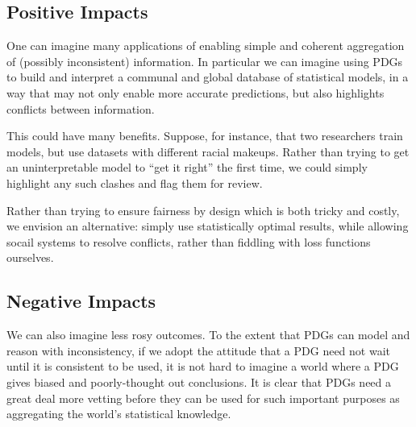 \documentclass[letterpaper]{article} %
\theoremstyle{plain}
\theoremstyle{definition}
\theoremstyle{remark}
\begin{document}
\subsection{Positive Impacts}
One can imagine many applications of enabling simple and coherent
aggregation of (possibly inconsistent) information. In particular we
can imagine using PDGs to build and interpret a communal and global
database of statistical models, in a way that may not only enable more
accurate predictions, but also highlights conflicts between
information.

This could have many benefits.
Suppose, for instance, that two researchers train models, but use
datasets with
different racial makeups. Rather than trying to get an uninterpretable
model to ``get it right'' the first time, we could simply highlight any
such clashes and flag them for review.

Rather than trying to
ensure fairness by design which is both tricky and costly,
we envision an alternative: simply use
statistically optimal results, while allowing socail systems to resolve conflicts,
rather than fiddling with loss functions ourselves.

\subsection{Negative Impacts}

We can also imagine less rosy outcomes. To the extent that PDGs can
model and reason with inconsistency,
if
we adopt the attitude that a PDG need not wait until it is consistent
to be used, it is not hard to imagine a world where a PDG gives biased and
poorly-thought out conclusions.
It is clear that PDGs need a great deal more
vetting before they can be used for such important purposes as
aggregating the world's statistical knowledge.
\end{document}
